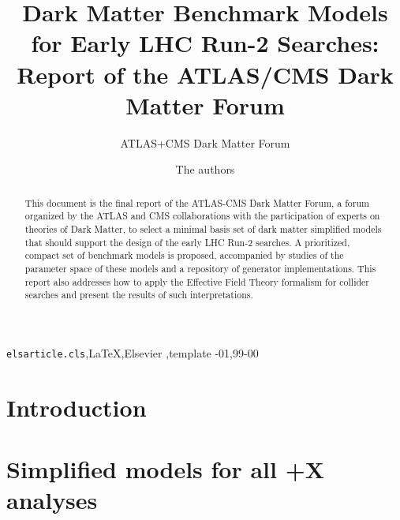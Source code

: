 \documentclass[review]{elsarticle}
\begin{document}
\begin{frontmatter}

\title{Dark Matter Benchmark Models for Early LHC Run-2 Searches: Report of the ATLAS/CMS Dark Matter Forum}
\author{ATLAS+CMS Dark Matter Forum}

\author{The authors}




\begin{abstract}
This document is the final report of the ATLAS-CMS Dark Matter Forum, a forum organized by the ATLAS and CMS collaborations with the participation of experts on theories of Dark Matter, to select a minimal basis set of dark matter simplified models that should support the design of the early LHC Run-2 searches. A prioritized, compact set of benchmark models is proposed, accompanied by studies of the parameter space of these models and a repository of generator implementations. This report also addresses how to apply the Effective Field Theory formalism for collider searches and present the results of such interpretations.
\end{abstract}

\begin{keyword}
\texttt{elsarticle.cls}\sep \LaTeX\sep Elsevier \sep template
-01\sep  99-00
\end{keyword}

\end{frontmatter}



\linenumbers
\tableofcontents

\section{Introduction}
\label{sec:Introduction}


\section{\texorpdfstring{Simplified models for all \MET+X analyses}{Simplified models for all MET+X analyses}}
\label{subsec:MonojetLikeModels}

\end{document}
